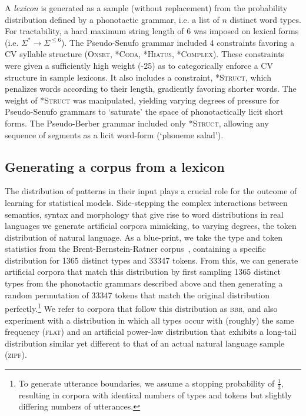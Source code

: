 \documentclass[11pt]{article}
\begin{document}
A \textit{lexicon} is generated as a sample (without replacement) from the probability distribution defined by a phonotactic grammar, i.e. a list of $n$ distinct word types. For tractability, a hard maximum string length of 6 was imposed on lexical forms (i.e. $\Sigma^* \to \Sigma^{\leq 6}$). The Pseudo-Senufo grammar included 4 constraints favoring a CV syllable structure (\textsc{Onset, *Coda, *Hiatus, *Complex}). These constraints were given a sufficiently high weight (-25) as to categorically enforce a CV structure in sample lexicons. It also includes a constraint, \textsc{*Struct}, which penalizes words according to their length, gradiently favoring shorter words. The weight of \textsc{*Struct} was manipulated, yielding varying degrees of pressure for Pseudo-Senufo grammars to `saturate' the space of phonotactically licit short forms. The Pseudo-Berber grammar included only \textsc{*Struct}, allowing any sequence of segments as a licit word-form (`phoneme salad'). 

\subsection{Generating a corpus from a lexicon}

The distribution of patterns in their input plays a crucial role for the outcome of learning for statistical models. Side-stepping the complex interactions between semantics, syntax and morphology that give rise to word distributions in real languages we generate artificial corpora mimicking, to varying degrees, the token distribution of natural language. As a blue-print, we take the type and token statistics from the Brent-Bernstein-Ratner corpus~\cite{Brent99a}, containing a specific distribution for 1365 distinct types and 33347 tokens. From this, we can generate artificial corpora that match this distribution by first sampling 1365 distinct types from the phonotactic grammars described above and then generating a random permutation of 33347 tokens that match the original distribution perfectly.\footnote{To generate utterance boundaries, we assume a stopping probability of $\frac{1}{3}$, resulting in corpora with identical numbers of types and tokens but slightly differing numbers of utterances.} We refer to corpora that follow this distribution as \textsc{bbr}, and also experiment with a distribution in which all types occur with (roughly) the same frequency (\textsc{flat}) and an artificial power-law distribution that exhibits a long-tail distribution similar yet different to that of an actual natural language sample (\textsc{zipf}). 
\end{document}
